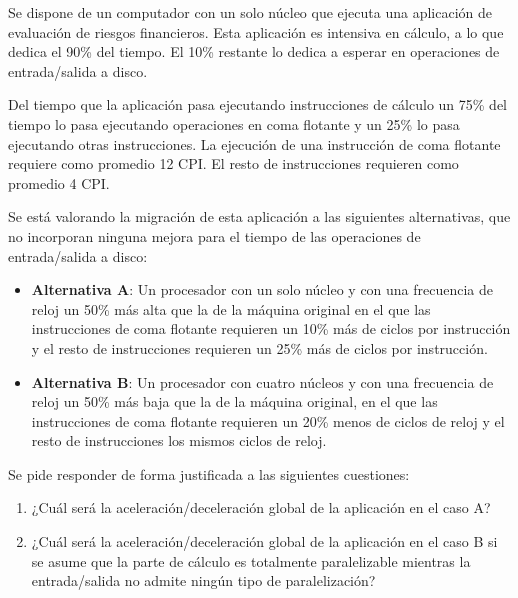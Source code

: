 \begin{acexercise}\end{acexercise}

Se dispone de un computador con un solo núcleo que ejecuta una aplicación de
evaluación de riesgos financieros. Esta aplicación es intensiva en cálculo, a
lo que dedica el 90\% del tiempo. El 10\% restante lo dedica a esperar en
operaciones de entrada/salida a disco.

Del tiempo que la aplicación pasa ejecutando instrucciones de cálculo un 75\%
del tiempo lo pasa ejecutando operaciones en coma flotante y un 25\% lo pasa
ejecutando otras instrucciones. La ejecución de una instrucción de coma
flotante requiere como promedio 12 CPI. El resto de instrucciones requieren
como promedio 4 CPI.

Se está valorando la migración de esta aplicación a las siguientes
alternativas, que no incorporan ninguna mejora para el tiempo de las
operaciones de entrada/salida a disco:

\begin{itemize}
  \item \textbf{Alternativa A}: Un procesador con un solo núcleo y con una
frecuencia de reloj un 50\% más alta que la de la máquina original en el que las
instrucciones de coma flotante requieren un 10\% más de ciclos por instrucción y
el resto de instrucciones requieren un 25\% más de ciclos por instrucción.

  \item \textbf{Alternativa B}: Un procesador con cuatro núcleos y con una
frecuencia de reloj un 50\% más baja que la de la máquina original, en el que
las instrucciones de coma flotante requieren un 20\% menos de ciclos de reloj y
el resto de instrucciones los mismos ciclos de reloj.  
\end{itemize}

Se pide responder de forma justificada a las siguientes cuestiones:
\begin{enumerate}

  \item ¿Cuál será la aceleración/deceleración global de la aplicación en el
caso A? 

  \item ¿Cuál será la aceleración/deceleración global de la aplicación en el
caso B si se asume que la parte de cálculo es totalmente paralelizable mientras
la entrada/salida no admite ningún tipo de paralelización?  \end{enumerate}


